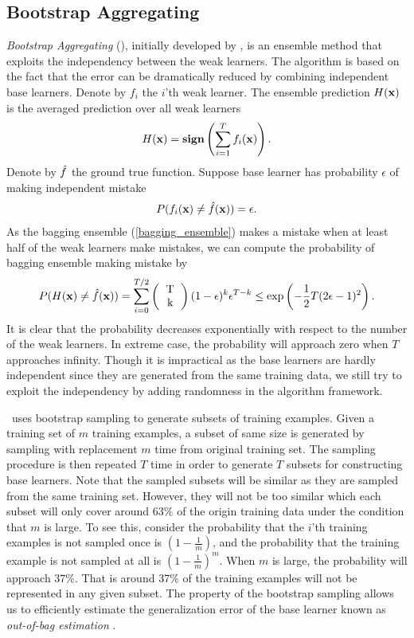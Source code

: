 {%
\subsection{Bootstrap Aggregating}
\textit{Bootstrap Aggregating} (\bagging), initially developed by \citet{Breiman96bagging}, is an ensemble method that exploits the independency between the weak learners.
The algorithm is based on the fact that the error can be dramatically reduced by combining independent base learners.
Denote by $f_i$ the $i$'th weak learner.
The ensemble prediction $H(\mathbf {x})$ is the averaged prediction over all weak learners
\begin{align}
	H(\mathbf {x}) = \textbf{sign}\left(\sum_{i=1}^{T}f_i(\mathbf {x})\right). \label{bagging_ensemble}
\end{align}
Denote by ${\hat{f}}$ the ground true function.
Suppose base learner has probability $\epsilon$ of making independent mistake
\begin{align*}
	P(f_i(\mathbf {x}) \ne {\hat{f}}(\mathbf {x})) = \epsilon.
\end{align*}
As the bagging ensemble (\ref{bagging_ensemble}) makes a mistake when at least half of the weak learners make mistakes, we can compute the probability of bagging ensemble making mistake by
\begin{align*}
	P(H(\vx)\neq\hatf(\vx)) = \sum_{i=0}^{T/2}\left(\begin{tabular}{cc}T\\k\end{tabular}\right)(1-\epsilon)^k\epsilon^{T-k} \le\exp\left(-\frac{1}{2}T(2\epsilon-1)^2\right).
\end{align*}
It is clear that the probability decreases exponentially with respect to the number of the weak learners.
In extreme case, the probability will approach zero when $T$ approaches infinity.
Though it is impractical as the base learners are hardly independent since they are generated from the same training data, we still try to exploit the independency by adding randomness in the algorithm framework.

\bagging\ uses bootstrap sampling \citep{Efron1994introduction} to generate subsets of training examples.
Given a training set of $m$ training examples, a subset of same size is generated by sampling with replacement $m$ time from original training set.
The sampling procedure is then repeated $T$ time in order to generate $T$ subsets for constructing base learners.
Note that the sampled subsets will be similar as they are sampled from the same training set.
However, they will not be too similar which each subset will only cover around $63\%$ of the origin training data under the condition that $m$ is large.
To see this, consider the probability that the $i$'th training examples is not sampled once is $(1-\frac{1}{m})$, and the probability that the training example is not sampled at all is $(1-\frac{1}{m})^m$.
When $m$ is large, the probability will approach $37\%$. 
That is around $37\%$ of the training examples will not be represented in any given subset.
The property of the bootstrap sampling allows us to efficiently estimate the generalization error of the base learner known as \textit{out-of-bag estimation} \citep{Breiman96out,Tibshirani1996bias,Wolpert99an}.

}
